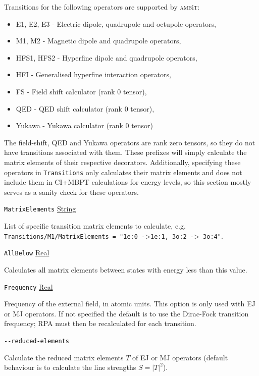 \documentclass{report}
\newcommand{\ambit}{\textsc{amb}{\footnotesize i}\textsc{t}}
\begin{document}
Transitions for the following operators are supported by \ambit:

\begin{itemize}
\item E1, E2, E3 - Electric dipole, quadrupole and octupole operators,
\item M1, M2 - Magnetic dipole and quadrupole operators,
\item HFS1, HFS2 - Hyperfine dipole and quadrupole operators,
\item HFI - Generalised hyperfine interaction operators,
\item FS - Field shift calculator (rank 0 tensor),
\item QED - QED shift calculator (rank 0 tensor),
\item Yukawa - Yukawa calculator (rank 0 tensor)
\end{itemize}

The field-shift, QED and Yukawa operators are rank zero tensors, so they do not have transitions
associated with them. These prefixes will simply calculate the matrix elements of their respective
decorators. Additionally, specifying these operators in \texttt{Transitions} only calculates their
matrix elements and does not include them in CI+MBPT calculations for energy levels, so this
section mostly serves as a sanity check for these operators.

\texttt{MatrixElements} \uline{String}
\begin{adjustwidth}{1cm}{}
List of specific transition matrix elements to calculate, e.g.
\texttt{Transitions/M1/MatrixElements = "1e:0 -}\textgreater \texttt{1e:1, 3o:2 -}\textgreater\texttt{ 3o:4"}.
\end{adjustwidth}

\texttt{AllBelow} \uline{Real}
\begin{adjustwidth}{1cm}{}
Calculates all matrix elements between states with energy less than this value.
\end{adjustwidth}

\texttt{Frequency} \uline{Real}
\begin{adjustwidth}{1cm}{}
Frequency of the external field, in atomic units. This option is only used with EJ or MJ operators. If not specified the default is to use the Dirac-Fock transition frequency; RPA must then be recalculated for each transition.
\end{adjustwidth}

\texttt{{-}{-}reduced-elements} 
\begin{adjustwidth}{1cm}{}
Calculate the reduced matrix elements $T$ of EJ or MJ operators (default behaviour is to calculate the line strengths 
$S = |T|^2$).
\end{adjustwidth}
\end{document}
